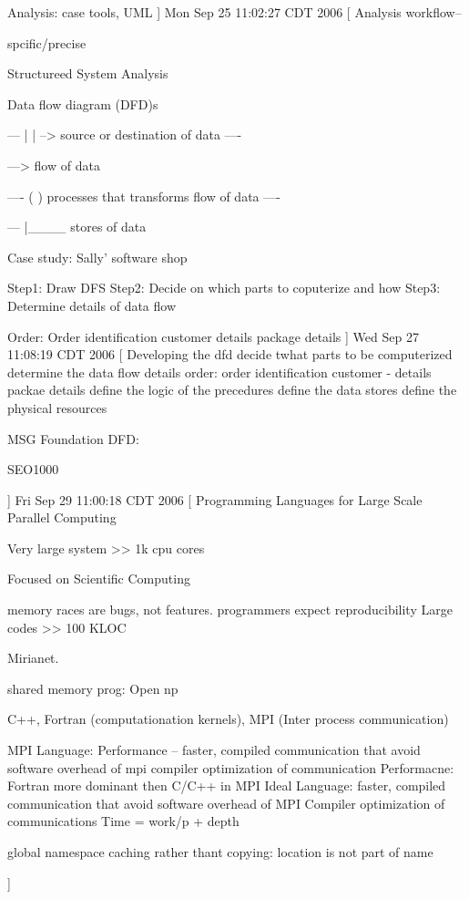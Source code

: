 \documentclass[a4paper]{article}
\begin{document}
{Analysis:
   case tools, UML
]
Mon Sep 25 11:02:27 CDT 2006
[
Analysis workflow--

   spcific/precise

Structureed System Analysis

  Data flow diagram (DFD)s

  ---
  |  |   --> source or destination of data
  ----

  --->       flow of data

  ----
  (  )       processes that transforms flow of data
  ----

  ---
  |____		stores of data

  Case study:  Sally' software shop

Step1:  Draw DFS
Step2:  Decide on which parts to coputerize and how
Step3:  Determine details of data flow

 	Order:
	    Order identification
		customer details
		package details
]
Wed Sep 27 11:08:19 CDT 2006
[
 Developing the dfd
 decide twhat parts to be computerized
 determine the data flow details
      order:
	  	order identification
		customer - details
		packae details
 define the logic of the precedures
 define the data stores
 define the physical resources


 MSG Foundation DFD:

SEO1000

]
Fri Sep 29 11:00:18 CDT 2006
[
  Programming Languages for Large Scale Parallel Computing

  Very large system >> 1k cpu cores

  Focused on Scientific Computing

  	memory races are bugs, not features.
	programmers expect reproducibility
  Large codes
      >> 100 KLOC

	Mirianet.  

	shared memory prog:  Open np

	C++, Fortran (computationation kernels), MPI (Inter process communication)

	MPI Language:
	   Performance  -- 
	      faster, compiled communication that avoid software overhead of mpi
		  compiler optimization of communication
	   Performacne:  Fortran more dominant then C/C++ in MPI
    Ideal Language:
		  faster, compiled communication that avoid software overhead of MPI
		  Compiler optimization of communications
		  Time = work/p + depth

		  global namespace
		  	caching rather thant copying: location is not part of name

]
}
\end{document}
